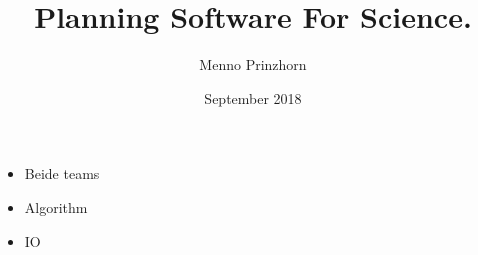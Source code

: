 \documentclass[11pt,a4paper]{article}
\begin{document}
\title{Planning Software For Science.}
\author{Menno Prinzhorn}
\date{September 2018}
\maketitle

\renewcommand\sfdefault{phv}
\renewcommand\mddefault{mc}
\renewcommand\bfdefault{bc}
\sffamily

\begin{itemize}
	\item Beide teams
	\item[\textcolor{blue}{\textbullet}] Algorithm
	\item[\textcolor{red}{\textbullet}] IO
\end{itemize}
\end{document}
